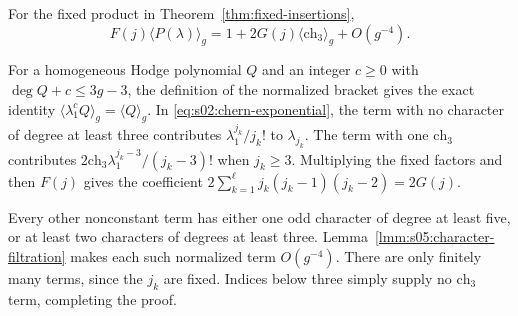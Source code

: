 \begin{crl}\label{crl:s05:algebraic-reduction}
For the fixed product in Theorem~\ref{thm:fixed-insertions},
\begin{equation}\label{eq:s05:algebraic-reduction}
 F(j)\langle P(\lambda)\rangle_g
 =1+2G(j)\langle\mathrm{ch}_3\rangle_g+O(g^{-4}).
\end{equation}
\end{crl}
\begin{prf}
For a homogeneous Hodge polynomial $Q$ and an integer $c\geq0$
with $\deg Q+c\leq3g-3$, the definition of the normalized bracket
gives the exact identity
$\langle\lambda_1^c Q\rangle_g=\langle Q\rangle_g$.
In \eqref{eq:s02:chern-exponential}, the term with no character of
degree at least three contributes $\lambda_1^{j_k}/j_k!$ to
$\lambda_{j_k}$. The term with one $\mathrm{ch}_3$ contributes
$2\mathrm{ch}_3\lambda_1^{j_k-3}/(j_k-3)!$ when $j_k\geq3$.
Multiplying the fixed factors and then $F(j)$ gives the coefficient
$2\sum_{k=1}^{\ell}j_k(j_k-1)(j_k-2)=2G(j)$.

Every other nonconstant term has either one odd character of degree
at least five, or at least two characters of degrees at least three.
Lemma~\ref{lmm:s05:character-filtration} makes each such normalized
term $O(g^{-4})$. There are only finitely many terms, since the
$j_k$ are fixed. Indices below three simply supply no
$\mathrm{ch}_3$ term, completing the proof.
\end{prf}
